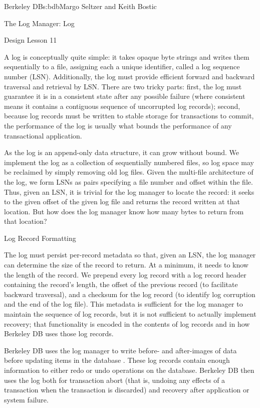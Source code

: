 \begin{aosachapter}{Berkeley DB}{s:bdb}{Margo Seltzer and Keith Bostic}
\begin{aosasect1}{The Log Manager: Log}
\begin{aosabox}{Design Lesson 11}
\end{aosabox}

A log is conceptually quite simple: it takes opaque byte strings and
writes them sequentially to a file, assigning each a unique
identifier, called a log sequence number (LSN). Additionally, the log
must provide efficient forward and backward traversal and retrieval by
LSN\@.  There are two tricky parts: first, the log must guarantee it is
in a consistent state after any possible failure (where consistent
means it contains a contiguous sequence of uncorrupted log records);
second, because log records must be written to stable storage for
transactions to commit, the performance of the log is usually what
bounds the performance of any transactional application.

As the log is an append-only data structure, it can grow without
bound.  We implement the log as a collection of sequentially numbered
files, so log space may be reclaimed by simply removing old log
files. Given the multi-file architecture of the log, we form LSNs as
pairs specifying a file number and offset within the file. Thus, given
an LSN, it is trivial for the log manager to locate the record: it
seeks to the given offset of the given log file and returns the record
written at that location. But how does the log manager know how many
bytes to return from that location?

\begin{aosasect2}{Log Record Formatting}

The log must persist per-record metadata so that, given an LSN, the
log manager can determine the size of the record to return. At a
minimum, it needs to know the length of the record. We prepend every
log record with a log record header containing the record's length,
the offset of the previous record (to facilitate backward traversal),
and a checksum for the log record (to identify log corruption and the
end of the log file). This metadata is sufficient for the log manager
to maintain the sequence of log records, but it is not sufficient to
actually implement recovery; that functionality is encoded in the
contents of log records and in how Berkeley DB uses those log records.


Berkeley DB uses the log manager to write before- and after-images of
data before updating items in the database
\cite{bib:haerder:recovery}.  These log records contain enough
information to either redo or undo operations on the
database. Berkeley DB then uses the log both for transaction abort
(that is, undoing any effects of a transaction when the transaction is
discarded) and recovery after application or system failure.


\end{aosasect2}
\end{aosasect1}
\end{aosachapter}
